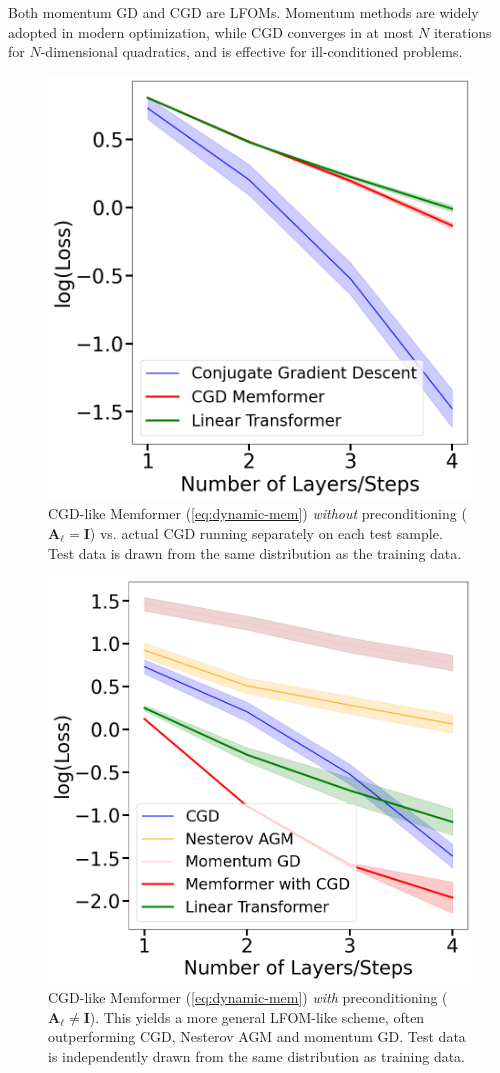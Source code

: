 \documentclass[11pt]{article}
\theoremstyle{plain}
\theoremstyle{definition}
\theoremstyle{remark}
\numberwithin{equation}{section}
\begin{document}
Both momentum GD and CGD are LFOMs. Momentum methods are widely adopted in modern optimization, while CGD converges in at most \(N\) iterations for \(N\)-dimensional quadratics, and is effective for ill-conditioned problems.
\begin{figure}[t]
  \centering
  \includegraphics[width=0.7\linewidth]{cg_without_preconditioning.png}
  \caption{%
    CGD-like Memformer (\ref{eq:dynamic-mem}) \emph{without} preconditioning
    (\(\mathbf{A}_\ell = \mathbf{I}\)) vs. actual CGD running separately on each test sample. Test data is drawn from the same distribution as the training data.
  }
  \label{fig:cg_without_preconditioning}
\end{figure}
\begin{figure}[t]
  \centering
  \includegraphics[width=0.7\linewidth]{cg_with_preconditioning.png}
  \caption{%
    CGD-like Memformer (\ref{eq:dynamic-mem}) \emph{with} preconditioning
    (\(\mathbf{A}_\ell\neq \mathbf{I}\)). This yields a more general LFOM-like scheme,
    often outperforming CGD, Nesterov AGM and momentum GD. Test data is independently drawn from the same distribution as training data.
  }
  \label{fig:cg_with_preconditioning}
\end{figure}
\end{document}
